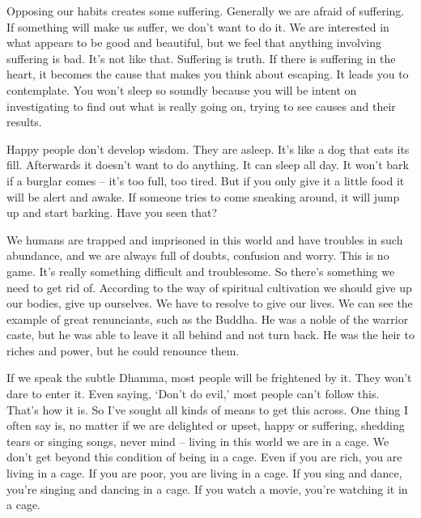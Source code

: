 Opposing our habits creates some suffering. Generally we are afraid of suffering. If something will make us suffer, we don't want to do it. We are interested in what appears to be good and beautiful, but we feel that anything involving suffering is bad. It's not like that. Suffering is  truth. If there is suffering in the heart, it becomes the cause that makes you think about escaping. It leads you to contemplate. You won't sleep so soundly because you will be intent on investigating to find out what is really going on, trying to see causes and their results.

Happy people don't develop wisdom. They are asleep. It's like a dog that eats its fill. Afterwards it doesn't want to do anything. It can sleep all day. It won't bark if a burglar comes -- it's too full, too tired. But if you only give it a little food it will be alert and awake. If someone tries to come sneaking around, it will jump up and start barking. Have you seen that?

We humans are trapped and imprisoned in this world and have troubles in such abundance, and we are always full of doubts, confusion and worry. This is no game. It's really something difficult and troublesome. So there's something we need to get rid of. According to the way of spiritual cultivation we should give up our bodies, give up ourselves. We have to resolve to give our lives. We can see the example of great renunciants, such as the Buddha. He was a noble of the warrior caste, but he was able to leave it all behind and not turn back. He was the heir to riches and power, but he could renounce them.

If we speak the subtle Dhamma, most people will be frightened by it. They won't dare to enter it. Even saying, `Don't do evil,' most people can't follow this. That's how it is. So I've sought all kinds of means to get this across. One thing I often say is, no matter if we are delighted or upset, happy or suffering, shedding tears or singing songs, never mind -- living in this world we are in a cage. We don't get beyond this condition of being in a cage. Even if you are rich, you are living in a cage. If you are poor, you are living in a cage. If you sing and dance, you're singing and dancing in a cage. If you watch a movie, you're watching it in a cage.

